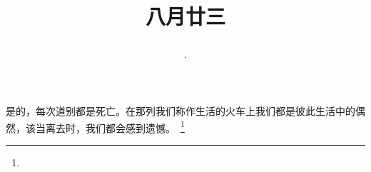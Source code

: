 \title{\date[d=25,m=9,y=2024][year:cn-y,年,month:cn,day:cn,日,·,weekday]·八月廿三 }
是的，每次道别都是死亡。在那列我们称作生活的火车上我们都是彼此生活中的偶然，该当离去时，我们都会感到遗憾。 \footnote{ }

